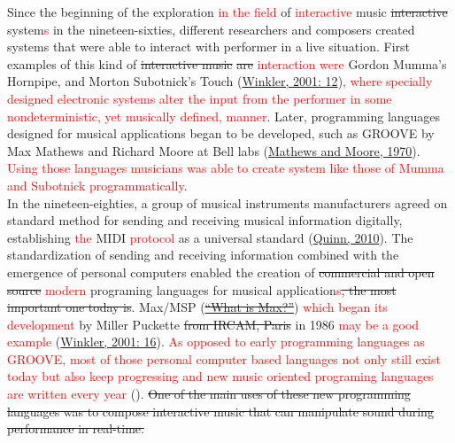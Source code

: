 \documentclass[a4paper,11pt]{article}
\begin{document}
Since the beginning of the exploration \textcolor{red}{in the field} of \textcolor{red}{interactive} music \st{interactive} system\textcolor{red}{s} in the nineteen-sixties, different researchers and composers created systems that were able to interact with performer in a live situation. First examples of this kind of \st{interactive music} \st{are} \textcolor{red}{interaction} \textcolor{red}{were} Gordon Mumma's Hornpipe, and Morton Subotnick's Touch (\href{http://blog.lib.umn.edu/geers001/emusic/14_assig_ComposingInteractiveMusicCh1-2.pdf}{Winkler, 2001: 12})\textcolor{red}{, where specially designed electronic systems alter the input from the performer in some nondeterministic, yet musically defined, manner}. Later, programming languages designed for musical applications began to be developed, such as GROOVE by Max Mathews and Richard Moore at Bell labs (\href{http://www.google.com/url?q=http://dl.acm.org/citation.cfm?id=362817&sa=D&sntz=1&usg=AFQjCNGjbiDeX2NVVGWgXlLs5cnJJrbEvw}{Mathews and Moore, 1970}). \textcolor{red}{Using those languages musicians was able to create system like those of Mumma and Subotnick programmatically}.\\

In the nineteen-eighties, a group of musical instruments manufacturers agreed on standard method for sending and receiving musical information digitally, establishing \textcolor{red}{the }MIDI \textcolor{red}{protocol} as a universal standard (\href{http://www.insidetechnology360.com/index.php/the-history-of-midi-8862/}{Quinn, 2010}). The standardization of sending and receiving information combined with the emergence of personal computers enabled the creation of \st{commercial and open source} \textcolor{red}{modern} programing languages for musical application\textcolor{red}{s}\st{, the most important one today is}. Max/MSP (\href{http://cycling74.com/whatismax/}{\st{``What is Max?''}}) \textcolor{red}{which began its development} by Miller Puckette \st{from IRCAM, Paris} in 1986 \textcolor{red}{may be a good example} (\href{http://blog.lib.umn.edu/geers001/emusic/14_assig_ComposingInteractiveMusicCh1-2.pdf}{Winkler, 2001: 16}). \textcolor{red}{As opposed to early programming languages as GROOVE, most of those personal computer based languages not only still exist today but also keep progressing and new music oriented programing languages are written every year} ().\st{ One of the main uses of these new programming languages was to compose interactive music that can manipulate sound during performance in real-time.}\\
\end{document}
